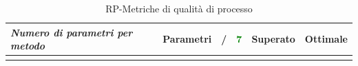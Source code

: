 \begin{longtable}{|>{\centering}m{5cm}|c|c|c|c|c|}
\emph{Numero di parametri per metodo} & {Parametri} & / &\textcolor{Green}{7} & Superato & Ottimale\\ \hline
\caption{RP-Metriche di qualità di processo}
\end{longtable}

